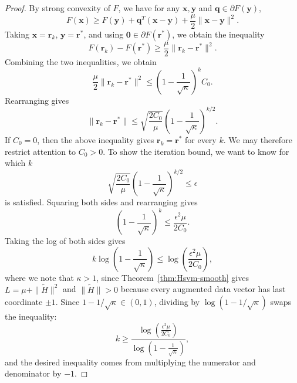 \documentclass[twoside,11pt]{article}
\newcommand\bz{\bm{0}}
\newcommand\q{\bm{q}}
\renewcommand\r{\bm{r}}
\newcommand\x{\bm{x}}
\newcommand\y{\bm{y}}
\newcommand\tH{\tilde{H}}
\begin{document}
\begin{proof}
    By strong convexity of $F$, we have for any $\x,\y$ and $\q \in \partial F(\y)$,
    \[
        F(\x) \geq F(\y) + \q^T(\x - \y) + \frac{\mu}{2}\|\x - \y\|^2.
    \]
    Taking $\x = \r_k$, $\y = \r^*$, and using $\bz \in \partial F(\r^*)$, we obtain the inequality
    \[
        F(\r_k) - F(\r^*) \geq \frac{\mu}{2}\|\r_k - \r^*\|^2.
    \]
    Combining the two inequalities, we obtain
    \[
        \frac{\mu}{2}\|\r_k - \r^*\|^2 \leq \left(1 - \frac{1}{\sqrt{\kappa}}\right)^kC_0.
    \]
    Rearranging gives
    \[
        \|\r_k - \r^*\| \leq \sqrt{\frac{2C_0}{\mu}}\left(1 - \frac{1}{\sqrt{\kappa}}\right)^{k/2}.
    \]
    If $C_0=0$, then the above inequality gives $\r_k=\r^*$ for every $k$. We may therefore restrict attention to $C_0 > 0$.
    To show the iteration bound, we want to know for which $k$
    \[
        \sqrt{\frac{2C_0}{\mu}}\left(1 - \frac{1}{\sqrt{\kappa}}\right)^{k/2} \leq \epsilon
    \]
    is satisfied. Squaring both sides and rearranging gives
    \[
        \left(1 - \frac{1}{\sqrt{\kappa}}\right)^k \leq \frac{\epsilon^2\mu}{2C_0}.
    \]
    Taking the log of both sides gives
    \[
        k\log\left(1 - \frac{1}{\sqrt{\kappa}}\right) \leq \log\left(\frac{\epsilon^2\mu}{2C_0}\right),
    \]
    where we note that $\kappa > 1$, since Theorem~\ref{thm:Hsvm-smooth} gives $L = \mu + \|\tH\|^2$ and $\|\tH\| > 0$ because every augmented data vector has last coordinate $\pm 1$.
    Since $1 - 1/\sqrt{\kappa} \in (0,1)$, dividing by $\log(1 - 1/\sqrt{\kappa})$ swaps the inequality:
    \[
        k \geq \frac{\log\left(\frac{\epsilon^2\mu}{2C_0}\right)}{\log\left(1 - \frac{1}{\sqrt{\kappa}}\right)},
    \]
    and the desired inequality comes from multiplying the numerator and denominator by $-1$.
\end{proof}
\end{document}
